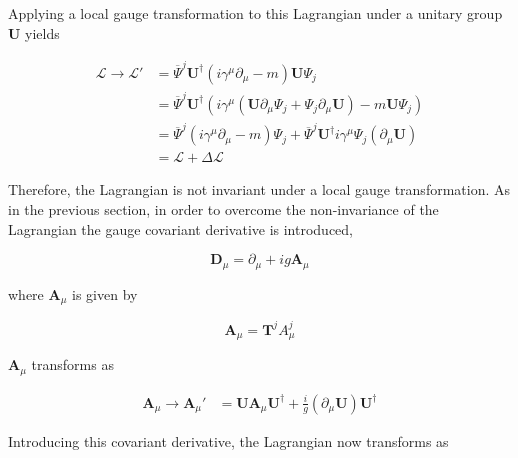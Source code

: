 \documentclass{article}
\begin{document}
Applying a local gauge transformation to this Lagrangian under a unitary group $\bm{U}$ yields

\begin{equation}
\label{eqn:localNonAbelianLagrangian}
\begin{split}
\mathcal{L}\rightarrow\mathcal{L'} & = \overline{\Psi}^j \bm{U}^\dagger (i\gamma^\mu \partial_\mu - m)\bm{U}\Psi_j \\
& = \overline{\Psi}^j \bm{U}^\dagger(i \gamma^\mu (\bm{U}\partial_\mu \Psi_j + \Psi_j \partial_\mu \bm{U}) - m\bm{U}\Psi_j) \\
& = \overline{\Psi}^j (i \gamma^\mu \partial_\mu - m)\Psi_j + \overline{\Psi}^j \bm{U}^\dagger i \gamma^\mu \Psi_j (\partial_\mu \bm{U}) \\
& = \mathcal{L} + \Delta \mathcal{L}
\end{split}
\end{equation}

Therefore, the Lagrangian is not invariant under a local gauge transformation.
As in the previous section, in order to overcome the non-invariance of the Lagrangian the gauge covariant derivative is introduced,

\begin{equation}
\label{eqn:nonAbelianCovariantDeriative}
\bm{D}_\mu = \partial_\mu + i g \bm{A}_\mu
\end{equation}

where $\bm{A}_\mu$ is given by 

\begin{equation}
\label{eqn:nonAbelianGaugeFieldDefinition}
\bm{A}_\mu = \bm{T}^j  A^{j}_\mu
\end{equation}

$\bm{A}_\mu$ transforms as 

\begin{equation}
\label{eqn:nonAbelianGaugeFieldTransformation}
\begin{split}
\bm{A}_\mu \rightarrow \bm{A}_\mu' &= \bm{U}\bm{A}_\mu\bm{U}^\dagger + \frac{i}{g}(\partial_\mu \bm{U} )\bm{U}^\dagger
\end{split}
\end{equation}

Introducing this covariant derivative, the Lagrangian now transforms as
\end{document}
